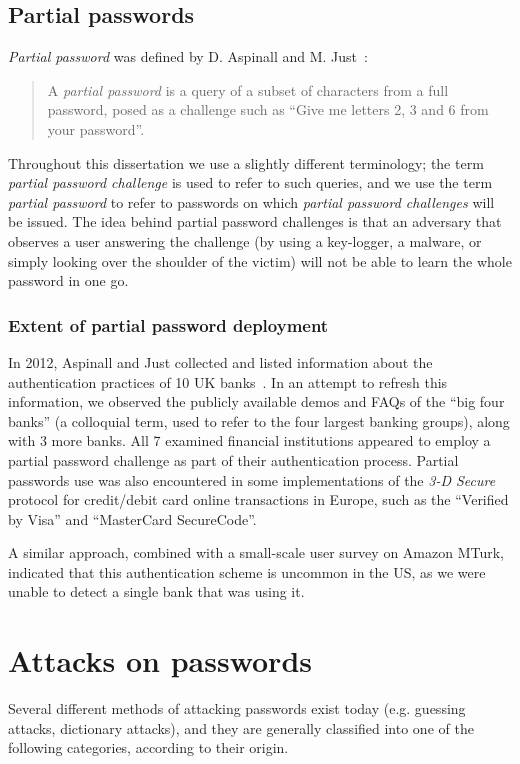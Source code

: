     \subsection{Partial passwords}
      \label{ssec:partial_passwords}
      \emph{Partial password} was defined by D. Aspinall and M. Just~\cite{part_pass}:
      \begin{quote}
      A \emph{partial password} is a query of a subset of characters from a full password, posed as a challenge such as ``Give me letters 2, 3 and 6 from your password''.
      \end{quote}
      Throughout this dissertation we use a slightly different terminology; the term \emph{partial password challenge} is used to refer to such queries, and we use the term \emph{partial password} to refer to passwords on which \emph{partial password challenges} will be issued. The idea behind partial password challenges is that an adversary that observes a user answering the challenge (\eg by using a key-logger, a malware, or simply looking over the shoulder of the victim) will not be able to learn the whole password in one go.

      \subsubsection{Extent of partial password deployment}
        \label{sssec:partial_pass_extent_use}
        In 2012, Aspinall and Just collected and listed information about the authentication practices of 10 UK banks~\cite{2fa_uk}. In an attempt to refresh this information, we observed the publicly available demos and FAQs of the ``big four banks'' (a colloquial term, used to refer to the four largest banking groups), along with 3 more banks. All 7 examined financial institutions appeared to employ a partial password challenge as part of their authentication process. Partial passwords use was also encountered in some implementations of the \emph{3-D Secure} protocol for credit/debit card online transactions in Europe, such as the ``Verified by Visa'' and ``MasterCard SecureCode''.

        A similar approach, combined with a small-scale user survey on Amazon MTurk, indicated that this authentication scheme is uncommon in the US, as we were unable to detect a single bank that was using it.

  \section{Attacks on passwords}
    \label{sec:password_attacks}
    Several different methods of attacking passwords exist today (e.g. guessing attacks, dictionary attacks), and they are generally classified into one of the following categories, according to their origin.

